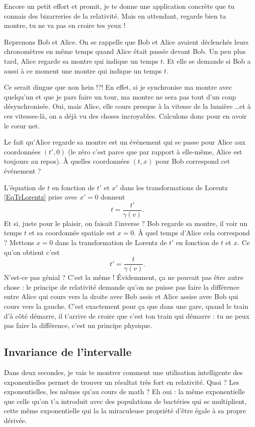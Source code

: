 Encore un petit effort et promit, je te donne une application concrète que tu connais des bizarreries de la relativité. Mais en attendant, regarde bien ta montre, tu ne va pas en croire tes yeux !

Reprenons Bob et Alice. On se rappelle que Bob et Alice avaient déclenchés leurs chronomètres en même temps quand Alice était passée devant Bob. Un peu plus tard, Alice regarde sa montre qui indique un temps $t$. Et elle se demande si Bob a aussi à ce moment une montre qui indique un temps $t$.

Ce serait dingue que non hein !?! En effet, si je synchronise ma montre avec quelqu'un et que je pars faire un tour, ma montre ne sera pas tout d'un coup  désynchronisée. Oui, mais Alice, elle cours presque à la vitesse de la lumière \ldots et à ces vitesses-là, on a déjà vu des choses incroyables. Calculons donc pour en avoir le c\oe ur net.

Le fait qu'Alice regarde sa montre est un événement qui se passe pour Alice aux coordonnées $(t',0)$ (le zéro c'est parce que par rapport à elle-même, Alice est toujours au repos). À quelles coordonnées $(t,x)$ pour Bob correspond cet événement ?

L'équation de $t$ en fonction de $t'$ et $x'$ dans les transformations de Lorentz \eqref{EqTrLorentz} prise avec $x'=0$ donnent
\[ 
  t=\frac{ t' }{ \gamma(v) }.
\]
Et si, juste pour le plaisir, on faisait l'inverse ? Bob regarde sa montre, il voir un temps $t$ et sa coordonnée spatiale est $x=0$. À quel temps d'Alice cela correspond ? Mettons $x=0$ dans la transformation de Lorentz de $t'$ en fonction de $t$ et $x$. Ce qu'on obtient c'est
\[ 
  	t'=\frac{ t }{ \gamma(v) }.
\]
N'est-ce pas génial ? C'est la même ! Évidemment, ça ne pouvait pas être autre chose : le principe de relativité demande qu'on ne puisse pas faire la différence entre Alice qui cours vers la droite avec Bob assis et Alice assise avec Bob qui cours vers la gauche. C'est exactement pour ça que dans une gare, quand le train d'à côté démarre, il t'arrive de croire que c'est ton train qui démarre : tu ne peux pas faire la différence, c'est un principe physique.


\subsection{Invariance de l'intervalle}

Dans deux secondes, je vais te montrer comment une utilisation intelligente des exponentielles permet de trouver un résultat très fort en relativité. Quoi ? Les exponentielles, les mêmes qu'au cours de math ? Eh oui : la même exponentielle que celle qu'on t'a introduit avec des populations de bactéries qui se multiplient, cette même exponentielle qui la la miraculeuse propriété d'être égale à sa propre dérivée.

